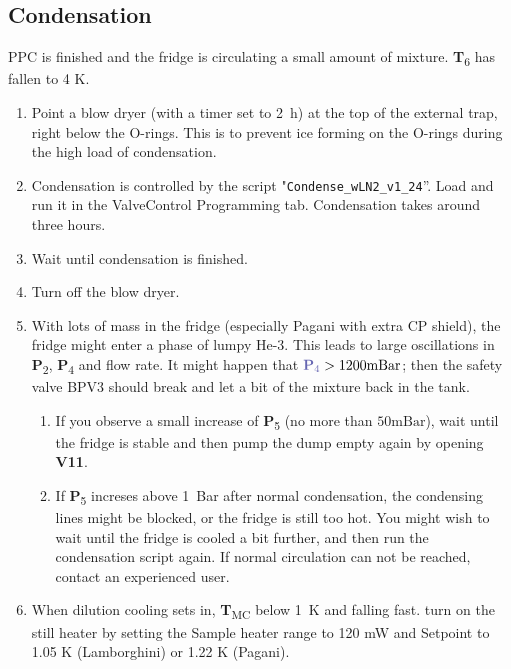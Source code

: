 \documentclass{article}[18pt,A4]
\newcommand{\mBar}{\mathrm{mBar}}
\newcommand{\valve}[1]{{\color{gray}\textbf{V#1}}}
\newcommand{\pressure}[1]{{\color{pressurecolor}\textbf{P}\textsubscript{#1}}}
\newcommand{\temperature}[1]{{\color{temperaturecolor}\textbf{T}\textsubscript{#1}}}
\begin{document}
\subsection{Condensation}
PPC is finished and the fridge is circulating a small amount of mixture. \temperature{6} has fallen to 4 K. 
\begin{enumerate}
    \item Point a blow dryer (with a timer set to 2~h) at the top of the external trap, right below the O-rings. This is to prevent ice forming on the O-rings during the high load of condensation.
    \item Condensation is controlled by the script "\texttt{Condense\_wLN2\_v1\_24}''. Load and run it in the ValveControl Programming tab. Condensation takes around three hours.
    \item Wait until condensation is finished.
    \item Turn off the blow dryer.
    \item With lots of mass in the fridge (especially Pagani with extra CP shield), the fridge might enter a phase of lumpy He-3. This leads to large oscillations in \pressure{2}, \pressure{4} and flow rate.
    It might happen that $\pressure{4} > 1200 \mBar$; then the safety valve BPV3 should break and let a bit of the mixture back in the tank. 
        \begin{enumerate}
        \item If you observe a small increase of \pressure{5} (no more than $50 \mBar$),
        wait until the fridge is stable and then pump the dump empty again by opening \valve{11}. 
        \item If \pressure{5} increses above 1~Bar after normal condensation, the condensing lines might be blocked,
or the fridge is still too hot.
    You might wish to wait until the fridge is cooled a bit further, and then run the condensation script again. 
If normal circulation can not be reached, contact an experienced user.
        \end{enumerate}
    \item When dilution cooling sets in, 
\temperature{MC} below 1~K and falling fast. 
    turn on the still heater by setting the Sample heater range to 120 mW and Setpoint to 1.05 K (Lamborghini) or 1.22 K (Pagani).
\end{enumerate}
\end{document}
